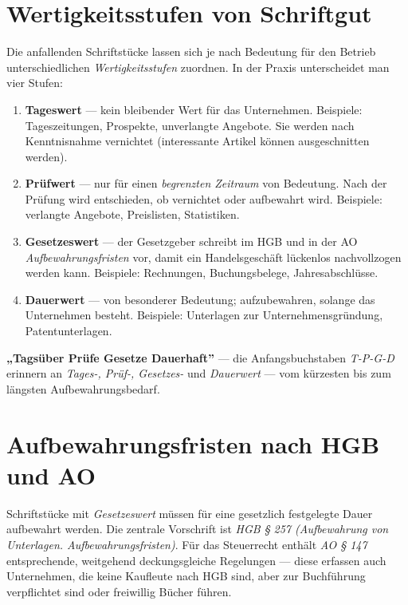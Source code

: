 \documentclass[11pt, a4paper]{article}
\begin{document}
\section{Wertigkeitsstufen von Schriftgut}

Die anfallenden Schriftstücke lassen sich je nach Bedeutung für den Betrieb
unterschiedlichen \emph{Wertigkeitsstufen} zuordnen. In der Praxis unterscheidet man
vier Stufen:

\begin{enumerate}
  \item \textbf{Tageswert} --- kein bleibender Wert für das Unternehmen. Beispiele:
    Tageszeitungen, Prospekte, unverlangte Angebote. Sie werden nach Kenntnisnahme
    vernichtet (interessante Artikel können ausgeschnitten werden).
  \item \textbf{Prüfwert} --- nur für einen \emph{begrenzten Zeitraum} von Bedeutung. Nach
    der Prüfung wird entschieden, ob vernichtet oder aufbewahrt wird. Beispiele:
    verlangte Angebote, Preislisten, Statistiken.
  \item \textbf{Gesetzeswert} --- der Gesetzgeber schreibt im HGB und in der AO
    \emph{Aufbewahrungsfristen} vor, damit ein Handelsgeschäft lückenlos nachvollzogen
    werden kann. Beispiele: Rechnungen, Buchungsbelege, Jahresabschlüsse.
  \item \textbf{Dauerwert} --- von besonderer Bedeutung; aufzubewahren, solange das
    Unternehmen besteht. Beispiele: Unterlagen zur Unternehmensgründung, Patentunterlagen.
\end{enumerate}

\begin{eselsbruecke}
\textbf{„Tagsüber Prüfe Gesetze Dauerhaft”} --- die Anfangsbuchstaben \emph{T-P-G-D}
erinnern an \emph{Tages-, Prüf-, Gesetzes-} und \emph{Dauerwert} --- vom kürzesten bis
zum längsten Aufbewahrungsbedarf.
\end{eselsbruecke}

\section{Aufbewahrungsfristen nach HGB und AO}

Schriftstücke mit \emph{Gesetzeswert} müssen für eine gesetzlich festgelegte Dauer
aufbewahrt werden. Die zentrale Vorschrift ist \emph{HGB § 257 (Aufbewahrung von
Unterlagen. Aufbewahrungsfristen)}. Für das Steuerrecht enthält \emph{AO § 147}
entsprechende, weitgehend deckungsgleiche Regelungen --- diese erfassen auch
Unternehmen, die keine Kaufleute nach HGB sind, aber zur Buchführung verpflichtet sind
oder freiwillig Bücher führen.
\end{document}
